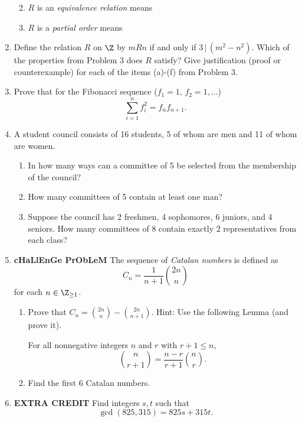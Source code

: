 \documentclass[12pt,letterpaper]{article}
\begin{document}
\begin{enumerate}
\begin{enumerate}
\vspace{5pc}
\item $R$ is an \emph{equivalence relation} means

\vspace{5pc}
\item $R$ is a \emph{partial order} means
\end{enumerate}

\newpage
\item Define the relation $R$ on $\Z$ by $mRn$ if and only if $3\,|\,(m^2-n^2)$.  Which of the properties from Problem 3 does $R$ satisfy?  Give justification (proof or counterexample) for each of the items (a)-(f) from Problem 3.

\newpage
\item Prove that for the Fibonacci sequence ($f_1=1,\,f_2=1,\dots$)
\[\sum_{i=1}^nf_i^2=f_nf_{n+1}.\]

\newpage
\item A student council consists of 16 students, 5 of whom are men and 11 of whom are women.
\begin{enumerate}

\vspace{1pc}
\item In how many ways can a committee of 5 be selected from the membership of the council?

\vspace{10pc}
\item How many committees of 5 contain at least one man?

\vspace{10pc} 
\item Suppose the council has 2 freshmen, 4 sophomores, 6 juniors, and 4 seniors.  How many committees of 8 contain exactly 2 representatives from each class?  
\end{enumerate}

\newpage
\item {\bf cHaLlEnGe PrObLeM} The sequence of \emph{Catalan numbers} is defined as
\[C_n=\frac{1}{n+1}\binom{2n}{n}\]
for each $n\in\Z_{\geq 1}$.
\begin{enumerate}
\item Prove that $C_n=\binom{2n}{n}-\binom{2n}{n+1}$.  Hint: Use the following Lemma (and prove it).

\begin{lem*} For all nonnegative integers $n$ and $r$ with $r+1\leq n$, 
\[\binom{n}{r+1}=\frac{n-r}{r+1}\binom{n}{r}.\]
\end{lem*} 

\vspace{25pc}
\item Find the first 6 Catalan numbers.
\end{enumerate} 

\newpage
\item {\bf EXTRA CREDIT} Find integers $s,t$ such that 
\[\gcd(825,315)=825s+315t.\]

\end{enumerate}
\end{document}
